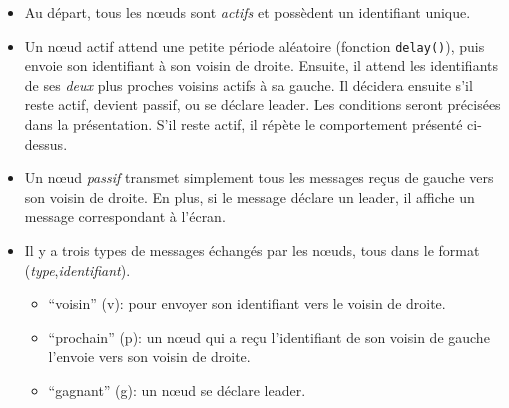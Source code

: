 \documentclass[11pt]{article}
\begin{document}
\begin{itemize}
\item Au départ, tous les nœuds sont \emph{actifs} et possèdent un identifiant
unique.

\item Un nœud actif attend une petite période aléatoire (fonction
\texttt{delay()}), puis envoie son identifiant à son voisin de droite. Ensuite,
il attend les identifiants de ses \emph{deux} plus proches voisins actifs à sa
gauche.  Il décidera ensuite s'il reste actif, devient passif, ou se déclare
leader. Les conditions seront précisées dans la présentation. S'il reste
actif, il répète le comportement présenté ci-dessus.

\item Un nœud \emph{passif} transmet simplement tous les messages reçus de
gauche vers son voisin de droite. En plus, si le message déclare un leader, il
affiche un message correspondant à l'écran.

\item Il y a trois types de messages échangés par les nœuds, tous dans le
format (\emph{type},\emph{identifiant}).

\begin{itemize}
  \item ``voisin'' (v): pour envoyer son identifiant vers le voisin de droite.
  \item ``prochain'' (p): un nœud qui a reçu l'identifiant de son voisin de
gauche l'envoie vers son voisin de droite.
  \item ``gagnant'' (g): un nœud se déclare leader.
\end{itemize}
\end{itemize}
\end{document}
